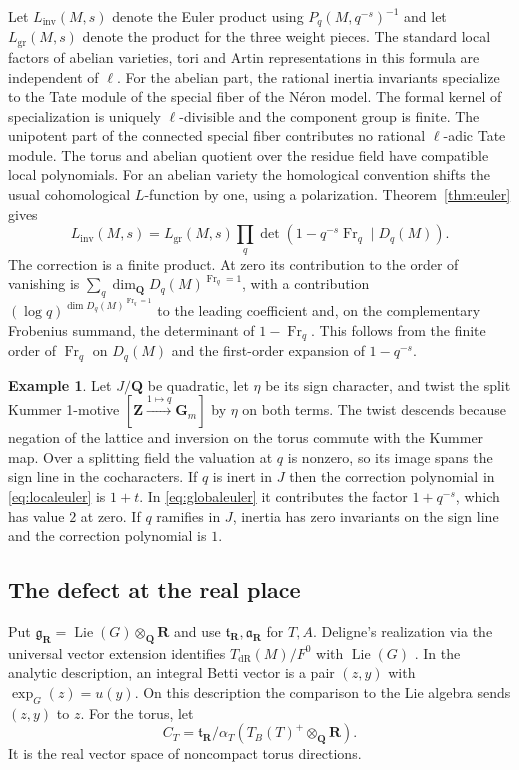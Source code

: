 \documentclass[11pt]{amsart}
\numberwithin{equation}{section}
\theoremstyle{definition}
\newtheorem{example}[theorem]{Example}
\theoremstyle{remark}
\newcommand{\Q}{\mathbf Q}
\newcommand{\Z}{\mathbf Z}
\newcommand{\R}{\mathbf R}
\newcommand{\Gm}{\mathbf G_m}
\newcommand{\Fr}{\operatorname{Fr}}
\newcommand{\Lie}{\operatorname{Lie}}
\newcommand{\gr}{\operatorname{gr}}
\begin{document}
Let $L_{\mathrm{inv}}(M,s)$ denote the Euler product using
$P_q(M,q^{-s})^{-1}$ and let $L_{\gr}(M,s)$ denote the product
for the three weight pieces. The standard local factors of
abelian varieties, tori and Artin representations in this
formula are independent of $\ell$. For the abelian part,
the rational inertia invariants specialize to the Tate
module of the special fiber of the N\'eron model. The
formal kernel of specialization is uniquely $\ell$-divisible
and the component group is finite. The unipotent part
of the connected special fiber contributes no rational
$\ell$-adic Tate module. The torus and abelian quotient
over the residue field have compatible local polynomials.
For an abelian variety the homological convention shifts the usual
cohomological $L$-function by one, using a polarization.
Theorem~\ref{thm:euler} gives
\begin{equation}\label{eq:globaleuler}
 L_{\mathrm{inv}}(M,s)=L_{\gr}(M,s)
 \prod_q\det(1-q^{-s}\Fr_q\mid D_q(M)).
\end{equation}
The correction is a finite product. At zero its contribution
to the order of vanishing is
$\sum_q \dim_\Q D_q(M)^{\Fr_q=1}$, with a contribution
$(\log q)^{\dim D_q(M)^{\Fr_q=1}}$ to the leading coefficient
and, on the complementary Frobenius summand, the determinant
of $1-\Fr_q$. This follows from the finite order of $\Fr_q$
on $D_q(M)$ and the first-order expansion of $1-q^{-s}$.

\begin{example}
Let $J/\Q$ be quadratic, let $\eta$ be its sign character,
and twist the split Kummer 1-motive
$[\Z\xrightarrow{1\mapsto q}\Gm]$ by $\eta$ on both terms.
The twist descends because negation of the lattice and
inversion on the torus commute with the Kummer map.
Over a splitting field the valuation at $q$ is nonzero,
so its image spans the sign line in the cocharacters.
If $q$ is inert in $J$ then the correction polynomial
in \eqref{eq:localeuler} is $1+t$. In
\eqref{eq:globaleuler} it contributes the factor
$1+q^{-s}$, which has value $2$ at zero. If $q$
ramifies in $J$, inertia has zero invariants on the
sign line and the correction polynomial is $1$.
\end{example}

\subsection{The defect at the real place}

Put $\mathfrak g_\R=\Lie(G)\otimes_\Q\R$ and use
$\mathfrak t_\R,\mathfrak a_\R$ for $T,A$. Deligne's
realization via the universal vector extension identifies
$T_{\mathrm{dR}}(M)/F^0$ with $\Lie(G)$
\cite[\S10.1]{DeligneIII}. In the analytic description,
an integral Betti vector is a pair $(z,y)$ with
$\exp_G(z)=u(y)$. On this description the comparison
to the Lie algebra sends $(z,y)$ to $z$.
For the torus, let
\[
  C_T=\mathfrak t_\R/\alpha_T(T_B(T)^+\otimes_\Q\R).
\]
It is the real vector space of noncompact torus directions.
\end{document}
